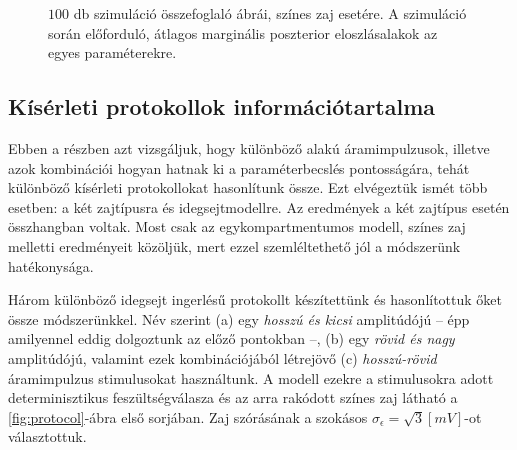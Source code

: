 \begin{figure}[h!]
	\centering
	\caption[\textit{Stick and ball}, két paraméter, színes zaj eredmény]{$100$ db szimuláció összefoglaló ábrái, színes zaj esetére. A szimuláció során előforduló, átlagos marginális poszterior eloszlásalakok az egyes paraméterekre.}
	\label{fig:cn2}
\end{figure}


\FloatBarrier
\clearpage
\subsection{Kísérleti protokollok információtartalma}
Ebben a részben azt vizsgáljuk, hogy különböző alakú áramimpulzusok, illetve azok kombinációi hogyan hatnak ki a paraméterbecslés pontosságára, tehát különböző kísérleti protokollokat hasonlítunk össze. Ezt elvégeztük ismét több esetben: a két zajtípusra és idegsejtmodellre. Az eredmények a két zajtípus esetén összhangban voltak. Most csak az egykompartmentumos modell, színes zaj melletti eredményeit közöljük, mert ezzel szemléltethető jól a módszerünk hatékonysága.

Három különböző idegsejt ingerlésű protokollt készítettünk és hasonlítottuk őket össze módszerünkkel. Név szerint (a) egy \textit{hosszú és kicsi} amplitúdójú -- épp amilyennel eddig dolgoztunk az előző pontokban --, (b) egy \textit{rövid és nagy} amplitúdójú, valamint ezek kombinációjából létrejövő (c) \textit{hosszú-rövid} áramimpulzus stimulusokat használtunk. A modell ezekre a stimulusokra adott determinisztikus feszültségválasza és az arra rakódott színes zaj látható a \ref{fig:protocol}-ábra első sorjában. Zaj szórásának a szokásos $\sigma_\epsilon = \sqrt{3} \left[mV\right]$-ot választottuk.

